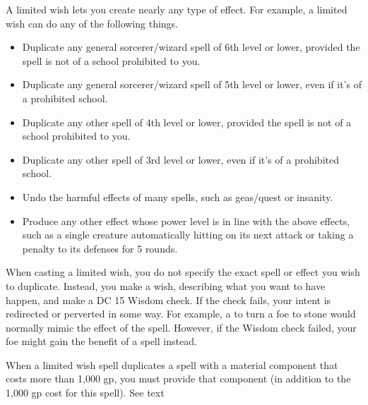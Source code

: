 \begin{spellheader}
\end{spellheader}
\begin{spellcontent}
    \begin{spelltargetinginfo}
    \end{spelltargetinginfo}
    \begin{spelleffects}
        \spelleffect A limited wish lets you create nearly any type of effect. For example, a limited wish can do any of the following things.
        \begin{itemize}
            \item Duplicate any general sorcerer/wizard spell of 6th level or lower, provided the spell is not of a school prohibited to you.
            \item Duplicate any general sorcerer/wizard spell of 5th level or lower, even if it's of a prohibited school.
            \item Duplicate any other spell of 4th level or lower, provided the spell is not of a school prohibited to you.
            \item Duplicate any other spell of 3rd level or lower, even if it's of a prohibited school.
            \item Undo the harmful effects of many spells, such as geas/quest or insanity.
            \item Produce any other effect whose power level is in line with the above effects, such as a single creature automatically hitting on its next attack or taking a  penalty to its defenses for 5 rounds.
        \end{itemize}
        \par When casting a limited wish, you do not specify the exact spell or effect you wish to duplicate. Instead, you make a wish, describing what you want to have happen, and make a DC 15 Wisdom check. If the check fails, your intent is redirected or perverted in some way. For example, a  to turn a foe to stone would normally mimic the  effect of the  spell. However, if the Wisdom check failed, your foe might gain the benefit of a  spell instead.
        \par When a limited wish spell duplicates a spell with a material component that costs more than 1,000 gp, you must provide that component (in addition to the 1,000 gp cost for this spell).
        \spelldur See text
    \end{spelleffects}
\end{spellcontent}
\begin{spellfooter}
\end{spellfooter}

